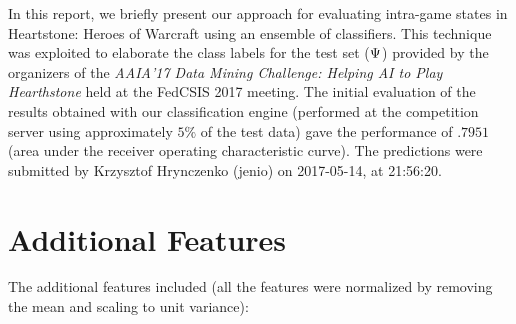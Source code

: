 \documentclass{svproc}
\begin{document}
In this report, we briefly present our approach for evaluating intra-game states in Heartstone: Heroes of Warcraft using an ensemble of classifiers. This technique was exploited to elaborate the class labels for the test set ($\Psi$) provided by the organizers of the \emph{AAIA'17 Data Mining Challenge: Helping AI to Play Hearthstone} held at the FedCSIS 2017 meeting. The initial evaluation of the results obtained with our classification engine (performed at the competition server using approximately $5\%$ of the test data) gave the performance of $.7951$ (area under the receiver operating characteristic curve). The predictions were submitted by Krzysztof Hrynczenko (jenio) on 2017-05-14, at 21:56:20.

\section{Additional Features} \label{sec:AlgorithmDescription}

The additional features included (all the features were normalized by removing the mean and scaling to unit variance):
\end{document}
